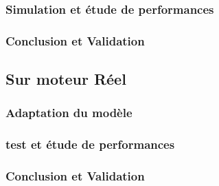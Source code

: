 		\subsubsection{Simulation et étude de performances}
		\subsubsection{Conclusion et Validation}
	\subsection{Sur moteur Réel}
		\subsubsection{Adaptation du modèle}
		\subsubsection{test et étude de performances}
		\subsubsection{Conclusion et Validation}
		
